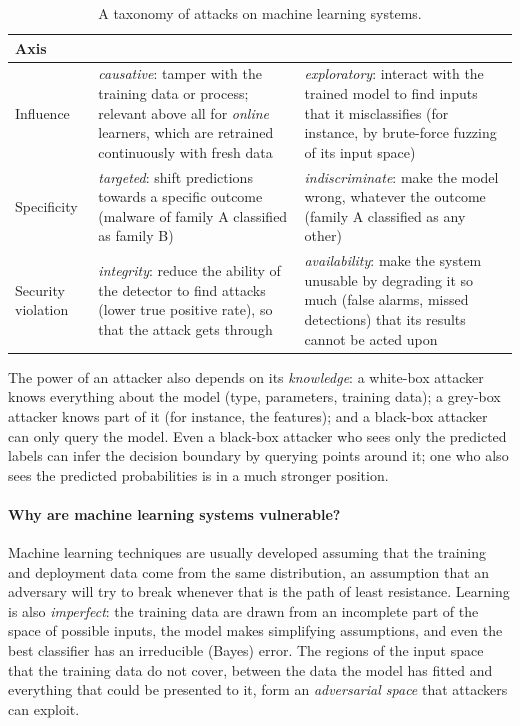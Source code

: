 \begin{table}[htbp]
\centering\small
\caption{A taxonomy of attacks on machine learning systems.}\label{tab:attacks}
\begin{tabularx}{\textwidth}{@{}>{\raggedright\arraybackslash}p{2.6cm}>{\raggedright\arraybackslash}X>{\raggedright\arraybackslash}X@{}}
\toprule
Axis & & \\
\midrule
Influence & \emph{causative}: tamper with the training data or process; relevant above all for
\emph{online} learners, which are retrained continuously with fresh data & \emph{exploratory}: interact
with the trained model to find inputs that it misclassifies (for instance, by brute-force fuzzing of its
input space)\\
Specificity & \emph{targeted}: shift predictions towards a specific outcome (malware of family A
classified as family B) & \emph{indiscriminate}: make the model wrong, whatever the outcome (family A
classified as any other)\\
Security violation & \emph{integrity}: reduce the ability of the detector to find attacks (lower true
positive rate), so that the attack gets through & \emph{availability}: make the system unusable by
degrading it so much (false alarms, missed detections) that its results cannot be acted upon\\
\bottomrule
\end{tabularx}
\end{table}

The power of an attacker also depends on its \emph{knowledge}: a white-box attacker knows everything about
the model (type, parameters, training data); a grey-box attacker knows part of it (for instance, the
features); and a black-box attacker can only query the model. Even a black-box attacker who sees only the
predicted labels can infer the decision boundary by querying points around it; one who also sees the
predicted probabilities is in a much stronger position.

\paragraph{Why are machine learning systems vulnerable?} Machine learning techniques are usually
developed assuming that the training and deployment data come from the same distribution, an
assumption that an adversary will try to break whenever that is the path of least resistance. Learning is also
\emph{imperfect}: the training data are drawn from an incomplete part of the space of possible inputs,
the model makes simplifying assumptions, and even the best classifier has an irreducible (Bayes) error.
The regions of the input space that the training data do not cover, between the data the model has
fitted and everything that could be presented to it, form an \emph{adversarial space} that attackers can
exploit.

